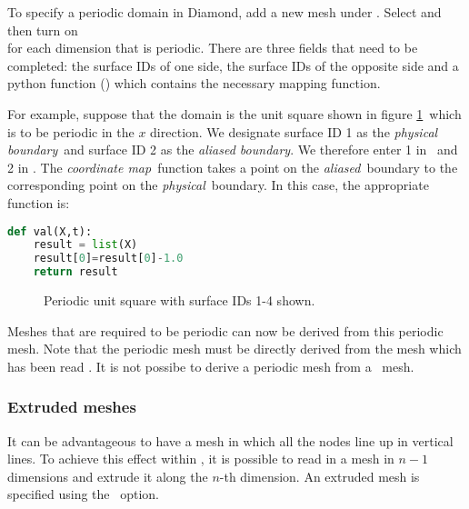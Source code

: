 To specify a periodic domain in Diamond, add a new mesh under
.  Select \onlypdf\linebreak
{} and then turn
on \onlypdf\\
 for each dimension
that is periodic. There are three fields that need to be completed: the
surface IDs of one side, the surface IDs of the opposite side and a python
function () which contains the necessary mapping
function.

For example, suppose that the domain is the unit square shown in figure
\ref{fig:periodic}\ which is to be periodic in the $x$ direction. We
designate surface ID 1 as the \emph{physical boundary}\ and surface ID 2 as the
\emph{aliased boundary}. We therefore enter 1 in
\ and 2 in
. The \emph{coordinate map}\ function
takes a point on the \emph{aliased}\ boundary to the corresponding point on
the \emph{physical}\ boundary. In this case, the appropriate function is:
\begin{lstlisting}[language=Python]
def val(X,t):
    result = list(X)
    result[0]=result[0]-1.0
    return result
\end{lstlisting}

\begin{figure}[ht]
  \centering
  \caption{Periodic unit square with surface IDs 1-4 shown.}
  \label{fig:periodic}
\end{figure}

Meshes that are required to be periodic can now be derived from this
periodic mesh. Note that the periodic mesh must be directly derived from the
mesh which has been read . It is not possibe to derive a
periodic mesh from a \ mesh.

\subsubsection{Extruded meshes}\label{Sect:extruded}

It can be advantageous to have a mesh in which all the nodes line up in
vertical lines. To achieve this effect within \fluidity, it is possible to
read in a mesh in $n-1$ dimensions and extrude it along the $n$-th
dimension. An extruded mesh is specified using the
\ option. 

